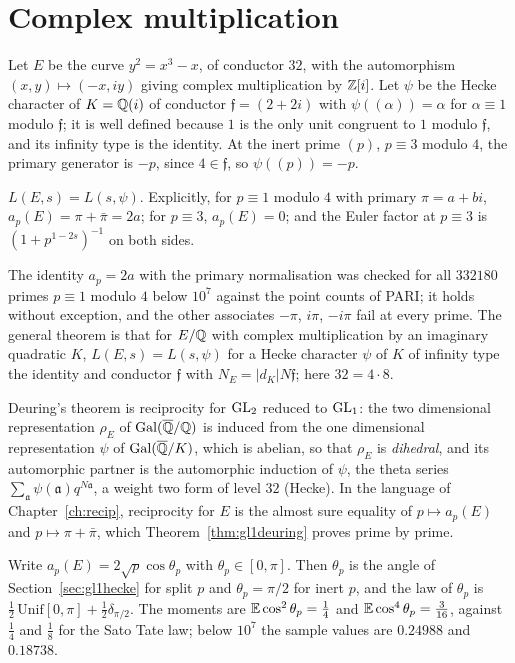 \section{Complex multiplication}\label{sec:gl1cm}

Let $E$ be the curve $y^2=x^3-x$, of conductor $32$, with the automorphism $(x,y)\mapsto(-x,iy)$ giving complex multiplication by $\mathbb{Z}[i]$. Let $\psi$ be the Hecke character of $K=\mathbb{Q}(i)$ of conductor $\mathfrak f=(2+2i)$ with $\psi((\alpha))=\alpha$ for $\alpha\equiv1$ modulo $\mathfrak f$; it is well defined because $1$ is the only unit congruent to $1$ modulo $\mathfrak f$, and its infinity type is the identity. At the inert prime $(p)$, $p\equiv3$ modulo $4$, the primary generator is $-p$, since $4\in\mathfrak f$, so $\psi((p))=-p$.

\begin{theorem}\label{thm:gl1deuring}
$L(E,s)=L(s,\psi)$. Explicitly, for $p\equiv1$ modulo $4$ with primary $\pi=a+bi$, $a_p(E)=\pi+\bar\pi=2a$; for $p\equiv3$, $a_p(E)=0$; and the Euler factor at $p\equiv3$ is $(1+p^{1-2s})^{-1}$ on both sides.
\end{theorem}

The identity $a_p=2a$ with the primary normalisation was checked for all $332180$ primes $p\equiv1$ modulo $4$ below $10^7$ against the point counts of PARI; it holds without exception, and the other associates $-\pi$, $i\pi$, $-i\pi$ fail at every prime. The general theorem is that for $E/\mathbb{Q}$ with complex multiplication by an imaginary quadratic $K$, $L(E,s)=L(s,\psi)$ for a Hecke character $\psi$ of $K$ of infinity type the identity and conductor $\mathfrak f$ with $N_E=|d_K|N\mathfrak f$; here $32=4\cdot8$.

Deuring's theorem is reciprocity for $\mathrm{GL}_2$ reduced to $\mathrm{GL}_1$: the two dimensional representation $\rho_E$ of $\operatorname{Gal}(\overline{\mathbb{Q}}/\mathbb{Q})$ is induced from the one dimensional representation $\psi$ of $\operatorname{Gal}(\overline{\mathbb{Q}}/K)$, which is abelian, so that $\rho_E$ is \emph{dihedral}, and its automorphic partner is the automorphic induction of $\psi$, the theta series $\sum_{\mathfrak a}\psi(\mathfrak a)q^{N\mathfrak a}$, a weight two form of level $32$ (Hecke). In the language of Chapter~\ref{ch:recip}, reciprocity for $E$ is the almost sure equality of $p\mapsto a_p(E)$ and $p\mapsto\pi+\bar\pi$, which Theorem~\ref{thm:gl1deuring} proves prime by prime.

\begin{proposition}\label{prop:gl1angle}
Write $a_p(E)=2\sqrt p\cos\theta_p$ with $\theta_p\in[0,\pi]$. Then $\theta_p$ is the angle of Section~\ref{sec:gl1hecke} for split $p$ and $\theta_p=\pi/2$ for inert $p$, and the law of $\theta_p$ is $\frac12\,\mathrm{Unif}[0,\pi]+\frac12\delta_{\pi/2}$. The moments are $\mathbb{E}\cos^2\theta_p=\frac14$ and $\mathbb{E}\cos^4\theta_p=\frac3{16}$, against $\frac14$ and $\frac18$ for the Sato Tate law; below $10^7$ the sample values are $0.24988$ and $0.18738$.
\end{proposition}

